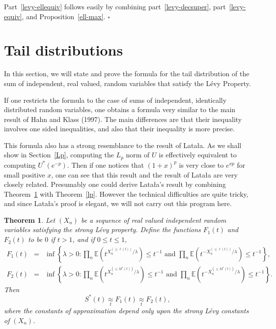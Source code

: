 \documentclass[12pt]{article}
\newtheorem{thm}{Theorem}[section]
\newcommand{\E}{{\mathbb E}}
\newcommand{\approxsb}[1]{\mathrel{\mathop{\approx}\limits_{#1}}}
\newcommand{\qed}{\leavevmode\unskip\penalty9999
                  \hbox{}\nobreak\hfill$\square$\goodbreak\medskip}
\begin{document}
Part~\ref{levy-ellequiv} follows easily by combining
part~\ref{levy-decsuper}, part~\ref{levy-equiv},
and Proposition~\ref{ell-max}. \qed

\section{Tail distributions}
\label{Tail}

In this section, we will state and prove 
the formula for the tail distribution of the sum of independent,
real valued, random variables that satisfy the L\'evy Property.

If one restricts the formula to the case of sums of
independent, identically distributed random variables, one obtains a
formula very similar to
the main result of Hahn and Klass (1997).  
The main differences are that their inequality involves one sided
inequalities, and also that their inequality is more
precise.

This formula also has a strong resemblance to the result of Lata{\l}a.
As we shall show in Section~\ref{Lp}, computing the $L_p$ norm of $U$ is
effectively equivalent to computing $U^*(e^{-p})$.  Then if one
notices that $(1+x)^p$ is very close to $e^{xp}$ for small positive $x$, one
can see that this result and the result of Lata{\l}a are very closely related.
Presumably one could derive Lata{\l}a's result by combining Theorem~\ref{tail} 
with
Theorem~\ref{lp}.  However the technical difficulties are quite tricky, and 
since
Lata{\l}a's proof is elegant, we will not carry out this program here.

\begin{thm}
\label{tail}
Let $(X_n)$ be a sequence of real valued
independent 
random variables satisfying the strong L\'evy property. Define the
functions $F_1(t)$ and $F_2(t)$ to be $0$ if $t > 1$, and if $0 \le
t \le 1$, 
\begin{eqnarray*}
  F_1(t) &=&
    \inf\left\{ \lambda>0 :\prod_n
    \E(t^{X_n^{(\le \ell(t))}/\lambda}) \le t^{-1} \text{ and }
    \prod_n
    \E(t^{-X_n^{(\le \ell(t))}/\lambda}) \le t^{-1} \right\} , \\
  F_2(t) &=&
    \inf\left\{ \lambda>0 :\prod_n \E(t^{X_n^{(\le
    M^*(t))}/\lambda}) \le t^{-1} \text{ and }
    \prod_n \E(t^{-X_n^{(\le
    M^*(t))}/\lambda}) \le t^{-1} \right\} . 
\end{eqnarray*} 
Then 
$$ S^*(t)
\approxsb t F_1(t) \approxsb t F_2(t) ,$$ where the constants
of approximation depend only upon the strong L\'evy constants of
$(X_n)$.
\end{thm}
\end{document}

